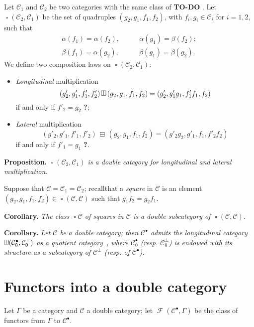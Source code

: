 \documentclass{article}
\newenvironment{itenv}[1]
  {\phantomsection\par\medskip\noindent\textbf{#1.}\itshape}
  {\par\medskip}
\newcommand{\todo}{{\color{purple}\textbf{TO-DO }}}
\newcommand{\unsure}[1]{{\color{purple}\textbf{#1}}}
\newcommand{\CC}{\mathcal{C}}
\newcommand{\dotc}{{\mathbin{\bullet}}}
\newcommand{\botc}{{\mathbin{\bot}}}
\DeclareMathOperator{\sq}{\square}
\DeclareMathOperator{\vsq}{{\rotatebox{90}{$\boxminus$}}}
\newcommand{\vmult}{{\,\rotatebox{90}{$\boxminus$}\,}}
\newcommand{\hmult}{{\,\boxminus\,}}
\DeclareMathOperator{\FF}{\mathcal{F}}
\begin{document}
Let $\CC_1$ and $\CC_2$ be two categories with the same class of \todo.
Let $\sq(\CC_2,\CC_1)$ be the set of quadruples $(g_2,g_1,f_1,f_2)$, with $f_i,g_i\in\CC_i$ for $i=1,2$, such that
\[
  \begin{aligned}
    \alpha(f_1)
    = \alpha(f_2),
    &\qquad
    \alpha(g_1)
    = \beta(f_2);
  \\\beta(f_1)
    = \alpha(g_2),
    &\qquad
    \beta(g_1)
    = \beta(g_2).
  \end{aligned}
\]
We define two composition laws on $\sq(\CC_2,\CC_1)$:
\begin{itemize}
  \item \emph{Longitudinal} multiplication
    \[
      (g'_2,g'_1,f'_1,f'_2)\vmult(g_2,g_1,f_1,f_2)
      = (g'_2,g'_1g_1,f'_1f_1,f_2)
    \]
    if and only if $f'_2=g_2$ \unsure{?};
  \item \emph{Lateral} multiplication
    \[
      (g'_2,g'_1,f'_1,f'_2)\hmult(g_2,g_1,f_1,f_2)
      = (g'_2g_2,g'_1,f_1,f'_2f_2)
    \]
    if and only if $f'_1=g_1$ \unsure{?}.
\end{itemize}

\begin{itenv}{Proposition}
  $\sq(\CC_2,\CC_1)$ is a double category for longitudinal and lateral multiplication.
\end{itenv}

Suppose that $\CC=\CC_1=\CC_2$;
recall\footnotemark that a \emph{square} in $\CC$ is an element $(g_2,g_1,f_1,f_2)\in\sq(\CC,\CC)$ such that $g_1f_2=g_2f_1$.

\begin{itenv}{Corollary}
  The class $\sq\CC$ of squares in $\CC$ is a double subcategory of $\sq(\CC,\CC)$.
\end{itenv}

\begin{itenv}{Corollary}
  Let $\CC$ be a double category;
  then $\CC^\dotc$ admits the longitudinal category $\vsq(\CC_0^\dotc,\CC_0^\botc)$ as a quotient category~, where $\CC_0^\dotc$ (resp. $\CC_0^\botc$) is endowed with its structure as a subcategory of $\CC^\botc$ (resp. of $\CC^\dotc$).
\end{itenv}


\section{Functors into a double category}

Let $\Gamma$ be a category and $\CC$ a double category;
let $\FF(\CC^\dotc,\Gamma)$ be the class of functors from $\Gamma$ to $\CC^\dotc$.
\end{document}
